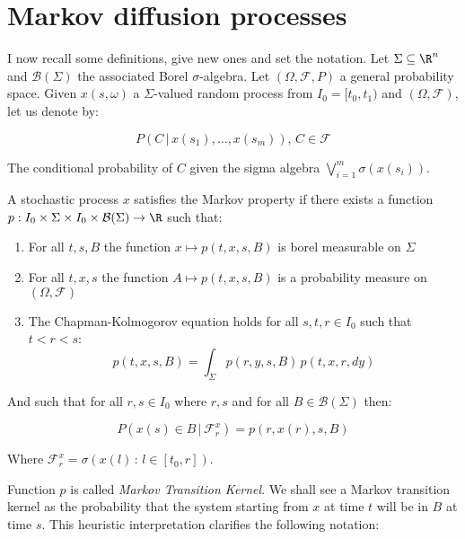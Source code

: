 \section{Markov diffusion processes}

I now recall some definitions, give new ones and set the notation. Let $\Sigma\subseteq\R^n$ and $\mathcal{B}(\Sigma)$ 
the associated Borel $\sigma$-algebra. Let $(\Omega, \mathcal{F}, P)$ a general probability space. 
Given $x(s,\omega)$ a $\Sigma$-valued random process from $I_0=[t_0,t_1)$ and $(\Omega,\mathcal{F})$, let us denote by:

\[P(C\,|\,x(s_1),\dots,x(s_m)),\,C\in\mathcal{F}\]

The conditional probability of $C$ given the sigma algebra $\bigvee_{i=1}^m\sigma(x(s_i))$.

\begin{definition}\label{2-1-markovprocessdef}
    A stochastic process $x$ satisfies the Markov property if there exists a function 
    $p:I_0\times \Sigma\times I_0\times  \mathcal{B}(\Sigma)\rightarrow \R$ such that:

    \begin{enumerate}
        \item For all $t,s,B$ the function $x\mapsto p(t,x,s,B)$ is borel measurable on $\Sigma$
        \item For all $t,x,s$ the function $A\mapsto p(t,x,s,B)$ is a probability measure on $(\Omega,\mathcal{F})$
        \item The Chapman-Kolmogorov equation holds for all $s,t,r\in I_0$ such that $t<r<s$:
        \begin{equation}\label{2-1-markovprocessdef-chapkol}
            p(t,x,s,B) = \int_{\Sigma} p(r,y,s,B)\,p(t,x,r,dy)
        \end{equation}
    \end{enumerate}

    And such that for all $r,s\in I_0$ where $r,s$ and for all $B\in\mathcal{B}(\Sigma)$ then:

    \begin{equation}\label{2-1-markovprocessdef-condonp}
        P(x(s)\in B\,|\,\mathcal{F}_r^x) = p(r,x(r),s,B)
    \end{equation}

    Where $\mathcal{F}_r^x=\sigma\left(x(l)\,:\,l\in[t_0,r]\right)$.
\end{definition}

Function $p$ is called \textit{Markov Transition Kernel}. We shall see a Markov transition kernel as 
the probability that the system starting from $x$ at time $t$ will be in $B$ at time $s$. This heuristic interpretation 
clarifies the following notation:

